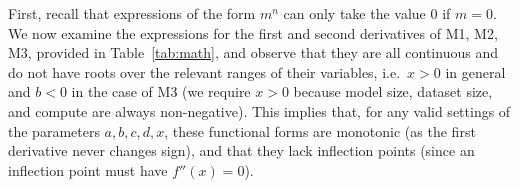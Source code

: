 \documentclass{article} %
\begin{document}


First, recall that expressions of the form $m^n$ can only take the value $0$ if $m=0$. 
We now examine the expressions for the first and second derivatives of M1, M2, M3, %
provided in Table~\ref{tab:math}, and observe that they are all continuous and do not have roots over the relevant ranges of their variables, i.e.\ $x>0$ in general and $b<0$ in the case of M3 
(we require $x > 0$ because model size, dataset size, and compute are always non-negative).
This implies that, for any valid settings of the parameters $a,b,c,d,x$, these functional forms are monotonic (as the first derivative never changes sign), and that they lack inflection points (since an inflection point must have $f''(x)=0$).
\end{document}
